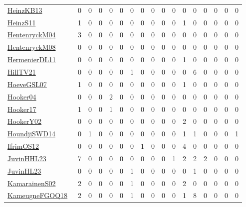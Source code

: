 {\begin{longtable}{l*{16}{r}}
\href{papers/HeinzKB13.pdf}{HeinzKB13}~\cite{HeinzKB13} & 0 & 0 & 0 & 0 & 0 & 0 & 0 & 0 & 0 & 0 & 0 & 0 & 0 & 0 & 0 & 0\\
\href{papers/HeinzS11.pdf}{HeinzS11}~\cite{HeinzS11} & 1 & 0 & 0 & 0 & 0 & 0 & 0 & 0 & 0 & 0 & 1 & 0 & 0 & 0 & 0 & 0\\
\href{papers/HentenryckM04.pdf}{HentenryckM04}~\cite{HentenryckM04} & 3 & 0 & 0 & 0 & 0 & 0 & 0 & 0 & 0 & 0 & 0 & 0 & 0 & 0 & 0 & 0\\
\href{papers/HentenryckM08.pdf}{HentenryckM08}~\cite{HentenryckM08} & 0 & 0 & 0 & 0 & 0 & 0 & 0 & 0 & 0 & 0 & 0 & 0 & 0 & 0 & 0 & 0\\
\href{papers/HermenierDL11.pdf}{HermenierDL11}~\cite{HermenierDL11} & 0 & 0 & 0 & 0 & 0 & 0 & 0 & 0 & 0 & 0 & 1 & 0 & 0 & 0 & 0 & 0\\
\href{papers/HillTV21.pdf}{HillTV21}~\cite{HillTV21} & 0 & 0 & 0 & 0 & 0 & 1 & 0 & 0 & 0 & 0 & 0 & 6 & 0 & 0 & 0 & 0\\
\href{papers/HoeveGSL07.pdf}{HoeveGSL07}~\cite{HoeveGSL07} & 1 & 0 & 0 & 0 & 0 & 0 & 0 & 0 & 0 & 0 & 1 & 0 & 0 & 0 & 0 & 0\\
\href{papers/Hooker04.pdf}{Hooker04}~\cite{Hooker04} & 0 & 0 & 0 & 2 & 0 & 0 & 0 & 0 & 0 & 0 & 0 & 0 & 0 & 0 & 0 & 0\\
\href{papers/Hooker17.pdf}{Hooker17}~\cite{Hooker17} & 1 & 0 & 0 & 1 & 0 & 0 & 0 & 0 & 0 & 0 & 0 & 0 & 0 & 0 & 0 & 0\\
\href{papers/HookerY02.pdf}{HookerY02}~\cite{HookerY02} & 0 & 0 & 0 & 0 & 0 & 0 & 0 & 0 & 0 & 0 & 2 & 0 & 0 & 0 & 0 & 0\\
\href{papers/HoundjiSWD14.pdf}{HoundjiSWD14}~\cite{HoundjiSWD14} & 0 & 1 & 0 & 0 & 0 & 0 & 0 & 0 & 0 & 0 & 1 & 1 & 0 & 0 & 0 & 1\\
\href{papers/IfrimOS12.pdf}{IfrimOS12}~\cite{IfrimOS12} & 0 & 0 & 0 & 0 & 0 & 0 & 1 & 0 & 0 & 0 & 4 & 0 & 0 & 0 & 0 & 0\\
\href{papers/JuvinHHL23.pdf}{JuvinHHL23}~\cite{JuvinHHL23} & 7 & 0 & 0 & 0 & 0 & 0 & 0 & 0 & 0 & 1 & 2 & 2 & 2 & 0 & 0 & 0\\
\href{papers/JuvinHL23.pdf}{JuvinHL23}~\cite{JuvinHL23} & 0 & 0 & 0 & 0 & 0 & 1 & 0 & 0 & 0 & 0 & 0 & 1 & 0 & 0 & 0 & 0\\
\href{papers/KamarainenS02.pdf}{KamarainenS02}~\cite{KamarainenS02} & 2 & 0 & 0 & 0 & 0 & 1 & 0 & 0 & 0 & 0 & 2 & 0 & 0 & 0 & 0 & 0\\
\href{papers/KameugneFGOQ18.pdf}{KameugneFGOQ18}~\cite{KameugneFGOQ18} & 2 & 0 & 0 & 0 & 0 & 1 & 0 & 0 & 0 & 0 & 1 & 8 & 0 & 0 & 0 & 0\\

\end{longtable}}

